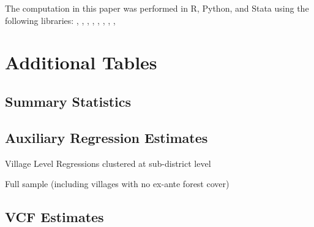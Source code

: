 \documentclass[12pt,reqno]{article}
\begin{document}
\appendix

The computation in this paper was performed in R, Python, and Stata using the following libraries:
\textcite{wickhamGgplot2ElegantGraphics2010}, 
\textcite{wickhamDplyrGrammarData2015}, 
\textcite{gaureLfeLinearGroup2013}, 
\textcite{mckinneyPandasFoundationalPython2011}, 
\textcite{jordahlGeoPandasPythonTools2014}, 
\textcite{waltNumPyArrayStructure2011},
\textcite{hunterMatplotlib2DGraphics2007},
\textcite{hainmueller2019much}, 
\textcite{correia2019reghdfe}


\section{Additional Tables}

\subsection{Summary Statistics} %
\label{ssub:summary_statistics}




\subsection{Auxiliary Regression Estimates}

\clearpage

\begin{centering}
\begin{table}[!htbp] \centering
  \caption{Village Level Regressions clustered at sub-district level}
  \label{table:regres2}
  
\end{table}
\end{centering}

\begin{centering}
\begin{table}[!htbp] \centering
  \label{table:fullsamp}
  \caption{Full sample (including villages with no ex-ante forest cover)}
  
\end{table}
\end{centering}



\subsection{VCF Estimates} %
\label{sub:vcf_est}

\end{document}
